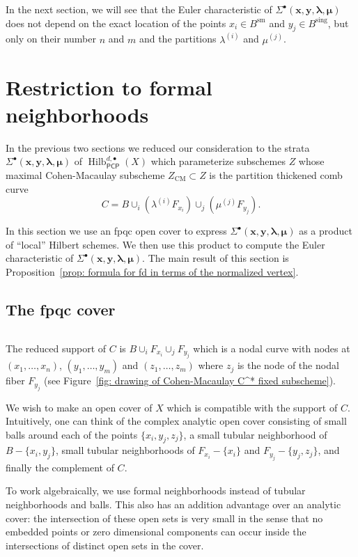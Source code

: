\documentclass[12pt]{amsart}
\theoremstyle{definition}
\newcommand{\Hilb}{\operatorname{Hilb}}
\newcommand{\CM}{\operatorname{CM}}
\newcommand{\sm}{\operatorname{sm}}
\newcommand{\sing}{\operatorname{sing}}
\newcommand{\boldx}{\boldsymbol{x}}
\newcommand{\boldy}{\boldsymbol{y}}
\newcommand{\boldlambda}{\boldsymbol{\lambda }}
\newcommand{\boldmu}{\boldsymbol{\mu }}
\newcommand{\Sigmaxylambdamu}{\Sigma^{\bullet }(\boldx ,\boldy ,\boldlambda ,\boldmu )}
\newcommand{\PCP}{\mathsf{PCP}}
\newcommand{\presectionspace}{\vspace{0.2cm}} %
\newcommand{\SubSecSpace}{$\,$\vspace{0.2cm}\par } %
\begin{document}
In the next section, we will see that the Euler characteristic of
$\Sigmaxylambdamu $ does not depend on the exact location of
the points $x_i \in B^{\sm}$ and $y_j \in B^{\sing}$, but only on
their number $n$ and $m$ and the partitions $\lambda^{(i)}$ and
$\mu^{(j)}$.



\presectionspace
\section{Restriction to formal neighborhoods} \label{sec: restriction
to formal nghds}

In the previous two sections we reduced our consideration to the
strata $\Sigmaxylambdamu $
of $ \Hilb^{d,\bullet}_{\PCP }(X)$ which parameterize subschemes $Z$ whose maximal
Cohen-Macaulay subscheme $Z_{\CM} \subset Z$ is the partition
thickened comb curve 
\[
C=B\cup_{i}(\lambda^{(i)}F_{x_{i}})\cup_{j}(\mu^{(j)}F_{y_{j}}).
\]

In this section we use an fpqc open cover to express
$\Sigmaxylambdamu$ as a product of ``local'' Hilbert schemes. We then
use this product to compute the Euler characteristic of
$\Sigmaxylambdamu$. The main result of this section is
Proposition~\ref{prop: formula for fd in terms of the normalized
vertex}.


\subsection{The fpqc cover}\label{subsec: the fpqc cover}\SubSecSpace
The reduced support of $C$ is $B\cup_{i}F_{x_{i}}\cup_{j}F_{y_{j}}$
which is a nodal curve with nodes at $(x_{1},\dotsc ,x_{n})$,
$(y_{1},\dotsc ,y_{m})$ and $(z_{1},\dotsc ,z_{m})$ where $z_{j}$ is
the node of the nodal fiber $F_{y_{j}}$ (see Figure~\ref{fig: drawing
of Cohen-Macaulay C^* fixed subscheme}).

We wish to make an open cover of $X$ which is compatible with the
support of $C$. Intuitively, one can think of the complex analytic
open cover consisting of small balls around each of the points
$\{x_{i},y_{j},z_{j} \}$, a small tubular neighborhood of
$B-\{x_{i},y_{j} \}$, small tubular neighborhoods of
$F_{x_{i}}-\{x_{i} \}$ and $F_{y_{j}}-\{y_{j},z_{j} \}$, and finally
the complement of $C$.

To work algebraically, we use formal neighborhoods instead of tubular
neighborhoods and balls. This also has an addition advantage over an
analytic cover: the intersection of these open sets is very small in
the sense that no embedded points or zero dimensional components can
occur inside the intersections of distinct open sets in the cover.
\end{document}
